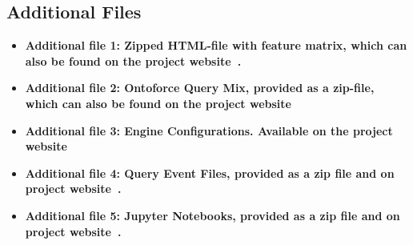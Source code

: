 \documentclass[twocolumn]{bmcart}%
\begin{document}
\begin{backmatter}


\section*{Additional Files}

\begin{itemize}
	\item \textbf{Additional file 1: Zipped HTML-file with feature matrix, which can also be found on the project website~\cite{fmatrix}.} 
	\item \textbf{Additional file 2: Ontoforce Query Mix, provided as a zip-file, which can also be found on the project website~\cite{deploy}} 
	\item \textbf{Additional file 3: Engine Configurations. Available on  the project website~\cite{deploy}}  
	\item \textbf{Additional file 4: Query Event Files, provided as a zip file and on project website~\cite{bmpostprocessing}.} 	  
	\item \textbf{Additional file 5: Jupyter Notebooks, provided as a zip file and on project website~\cite{bmpostprocessing}.} 	  	
	
\end{itemize}


\end{backmatter}
\end{document}
